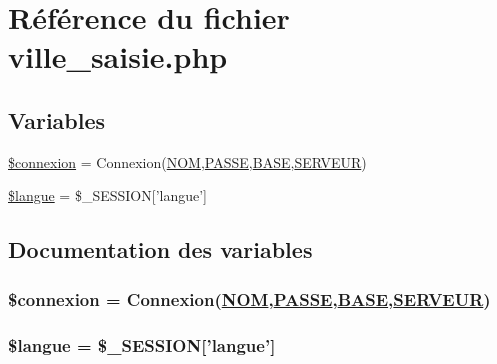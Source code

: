 \hypertarget{ville__saisie_8php}{
\section{R\'{e}f\'{e}rence du fichier ville\_\-saisie.php}
\label{ville__saisie_8php}
}
\subsection*{Variables}
\begin{CompactItemize}
\item 
\hyperlink{ville__saisie_8php_a0}{\$connexion} = Connexion(\hyperlink{pma__connect_8php_a0}{NOM},\hyperlink{pma__connect_8php_a1}{PASSE},\hyperlink{pma__connect_8php_a3}{BASE},\hyperlink{pma__connect_8php_a2}{SERVEUR})
\item 
\hyperlink{ville__saisie_8php_a1}{\$langue} = \$\_\-SESSION\mbox{[}'langue'\mbox{]}
\end{CompactItemize}


\subsection{Documentation des variables}
\hypertarget{ville__saisie_8php_a0}{
\subsubsection[\$connexion]{\setlength{\rightskip}{0pt plus 5cm}\$connexion = Connexion(\hyperlink{pma__connect_8php_a0}{NOM},\hyperlink{pma__connect_8php_a1}{PASSE},\hyperlink{pma__connect_8php_a3}{BASE},\hyperlink{pma__connect_8php_a2}{SERVEUR})}}
\label{ville__saisie_8php_a0}


\hypertarget{ville__saisie_8php_a1}{
\subsubsection[\$langue]{\setlength{\rightskip}{0pt plus 5cm}\$langue = \$\_\-SESSION\mbox{[}'langue'\mbox{]}}}
\label{ville__saisie_8php_a1}


